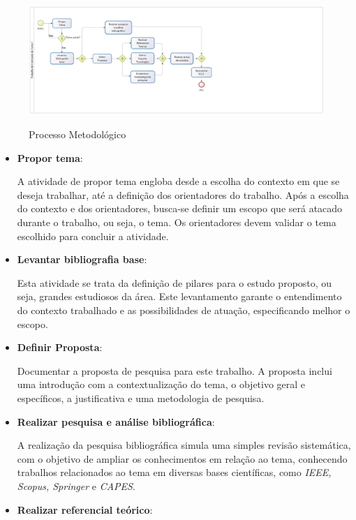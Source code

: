 \begin{figure}[H]
	\centering
	\caption{Processo Metodológico}
	\includegraphics[scale=0.6]{figuras/processo.eps}
	\label{img:processo}
\end{figure}

\begin{itemize}
	\item \textbf{Propor tema}:

		A atividade de propor tema engloba desde a escolha do contexto em que se deseja trabalhar, até a definição dos orientadores do trabalho. Após a escolha do contexto e dos orientadores, busca-se definir um escopo que será atacado durante o trabalho, ou seja, o tema. Os orientadores devem validar o tema escolhido para concluir a atividade.

	\item \textbf{Levantar bibliografia base}:

		Esta atividade se trata da definição de pilares para o estudo proposto, ou seja, grandes estudiosos da área. Este levantamento garante o entendimento do contexto trabalhado e as possibilidades de atuação, especificando melhor o escopo.

	\item \textbf{Definir Proposta}:

		Documentar a proposta de pesquisa para este trabalho. A proposta inclui uma introdução com a contextualização do tema, o objetivo geral e específicos, a justificativa e uma metodologia de pesquisa.

	\item \textbf{Realizar pesquisa e análise bibliográfica}:

		A realização da pesquisa bibliográfica simula uma simples revisão sistemática, com o objetivo de ampliar os conhecimentos em relação ao tema, conhecendo trabalhos relacionados ao tema em diversas bases científicas, como \textit{IEEE, Scopus, Springer} e \textit{CAPES}.

	\item \textbf{Realizar referencial teórico}:


\end{itemize}
